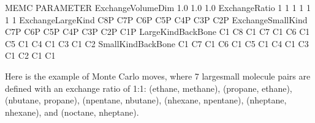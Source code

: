 \documentclass[letterpaper,10pt,english]{sphinxmanual}
\begin{document}
\begin{sphinxVerbatim}[commandchars=\\\{\}]
\PYGZsh{}\PYGZsh{}\PYGZsh{}\PYGZsh{}\PYGZsh{}\PYGZsh{}\PYGZsh{}\PYGZsh{}\PYGZsh{}\PYGZsh{}\PYGZsh{}\PYGZsh{}\PYGZsh{}\PYGZsh{}\PYGZsh{}\PYGZsh{}\PYGZsh{}\PYGZsh{}\PYGZsh{}\PYGZsh{}\PYGZsh{}\PYGZsh{}\PYGZsh{}\PYGZsh{}\PYGZsh{}\PYGZsh{}\PYGZsh{}\PYGZsh{}\PYGZsh{}\PYGZsh{}\PYGZsh{}\PYGZsh{}\PYGZsh{}\PYGZsh{}\PYGZsh{}\PYGZsh{}\PYGZsh{}\PYGZsh{}\PYGZsh{}\PYGZsh{}\PYGZsh{}\PYGZsh{}\PYGZsh{}\PYGZsh{}\PYGZsh{}\PYGZsh{}\PYGZsh{}\PYGZsh{}\PYGZsh{}\PYGZsh{}\PYGZsh{}\PYGZsh{}\PYGZsh{}\PYGZsh{}\PYGZsh{}\PYGZsh{}\PYGZsh{}\PYGZsh{}\PYGZsh{}\PYGZsh{}\PYGZsh{}\PYGZsh{}\PYGZsh{}\PYGZsh{}\PYGZsh{}\PYGZsh{}\PYGZsh{}\PYGZsh{}\PYGZsh{}\PYGZsh{}
\PYGZsh{} MEMC PARAMETER
\PYGZsh{}\PYGZsh{}\PYGZsh{}\PYGZsh{}\PYGZsh{}\PYGZsh{}\PYGZsh{}\PYGZsh{}\PYGZsh{}\PYGZsh{}\PYGZsh{}\PYGZsh{}\PYGZsh{}\PYGZsh{}\PYGZsh{}\PYGZsh{}\PYGZsh{}\PYGZsh{}\PYGZsh{}\PYGZsh{}\PYGZsh{}\PYGZsh{}\PYGZsh{}\PYGZsh{}\PYGZsh{}\PYGZsh{}\PYGZsh{}\PYGZsh{}\PYGZsh{}\PYGZsh{}\PYGZsh{}\PYGZsh{}\PYGZsh{}\PYGZsh{}\PYGZsh{}\PYGZsh{}\PYGZsh{}\PYGZsh{}\PYGZsh{}\PYGZsh{}\PYGZsh{}\PYGZsh{}\PYGZsh{}\PYGZsh{}\PYGZsh{}\PYGZsh{}\PYGZsh{}\PYGZsh{}\PYGZsh{}\PYGZsh{}\PYGZsh{}\PYGZsh{}\PYGZsh{}\PYGZsh{}\PYGZsh{}\PYGZsh{}\PYGZsh{}\PYGZsh{}\PYGZsh{}\PYGZsh{}\PYGZsh{}\PYGZsh{}\PYGZsh{}\PYGZsh{}\PYGZsh{}\PYGZsh{}\PYGZsh{}\PYGZsh{}\PYGZsh{}\PYGZsh{}
ExchangeVolumeDim   1.0   1.0   1.0
ExchangeRatio       1       1       1      1      1      1      1
ExchangeLargeKind   C8P    C7P    C6P    C5P    C4P    C3P    C2P
ExchangeSmallKind   C7P    C6P    C5P    C4P    C3P    C2P    C1P
LargeKindBackBone   C1 C8  C1 C7  C1 C6  C1 C5  C1 C4  C1 C3  C1 C2
SmallKindBackBone   C1 C7  C1 C6  C1 C5  C1 C4  C1 C3  C1 C2  C1 C1
\end{sphinxVerbatim}

\sphinxAtStartPar
Here is the example of  Monte Carlo moves, where 7 large\sphinxhyphen{}small molecule pairs are defined with an exchange ratio of 1:1: (ethane, methane), (propane, ethane), (n\sphinxhyphen{}butane, propane), (n\sphinxhyphen{}pentane, nbutane), (n\sphinxhyphen{}hexane, n\sphinxhyphen{}pentane), (n\sphinxhyphen{}heptane, n\sphinxhyphen{}hexane), and (noctane, n\sphinxhyphen{}heptane).
\end{document}
